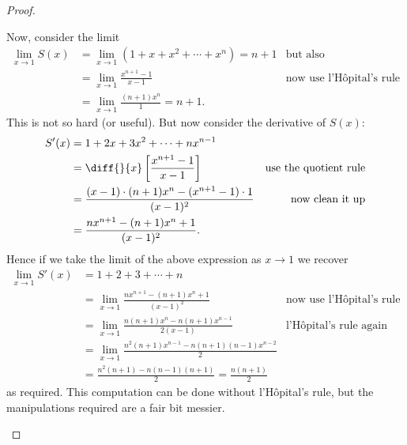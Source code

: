 \begin{proof}
\begin{enumerate}[(a)]
Now, consider the limit
\begin{align*}
\lim_{x\to 1} S(x) &= \lim_{x\to 1} \left(1+x+x^2+\cdots+x^n\right) = n+1 &\text{but
also}\\
&= \lim_{x\to 1} \frac{x^{n+1}-1}{x-1} &\text{now use l'H\^opital's rule}\\
&= \lim_{x\to 1} \frac{(n+1)x^n}{1} = n+1.
\end{align*}
This is not so hard (or useful). But now consider the derivative of $S(x)$:
\begin{align*}
S'(x) &= 1 +2x + 3x^2 + \cdots + n x^{n-1}\\
&= \diff{}{x} \left[\frac{x^{n+1}-1}{x-1}\right] & \text{use the quotient
rule}\\
&= \frac{(x-1)\cdot (n+1)x^n - (x^{n+1}-1)\cdot 1}{(x-1)^2} & \text{now clean
it up}\\
&= \frac{nx^{n+1}-(n+1)x^n+1}{(x-1)^2}.
\end{align*}
Hence if we take the limit of the above expression as $x\to 1$ we recover
\begin{align*}
\lim_{x\to 1} S'(x) &= 1 +2 +3+\cdots+n \\
&=\lim_{x\to 1} \frac{nx^{n+1}-(n+1)x^n+1}{(x-1)^2} & \text{now use l'H\^opital's rule}\\
&=\lim_{x\to 1} \frac{n(n+1)x^{n}-n(n+1)x^{n-1}}{2(x-1)}& \text{l'H\^opital's rule again}
\\
&=\lim_{x\to 1} \frac{n^2(n+1)x^{n-1}-n(n+1)(n-1)x^{n-2}}{2}\\
&= \frac{n^2(n+1) - n(n-1)(n+1)}{2} = \frac{n(n+1)}{2}
\end{align*}
as required. This computation can be done without l'H\^opital's rule, but the
manipulations required are a fair bit messier.

\end{enumerate}
\end{proof}
